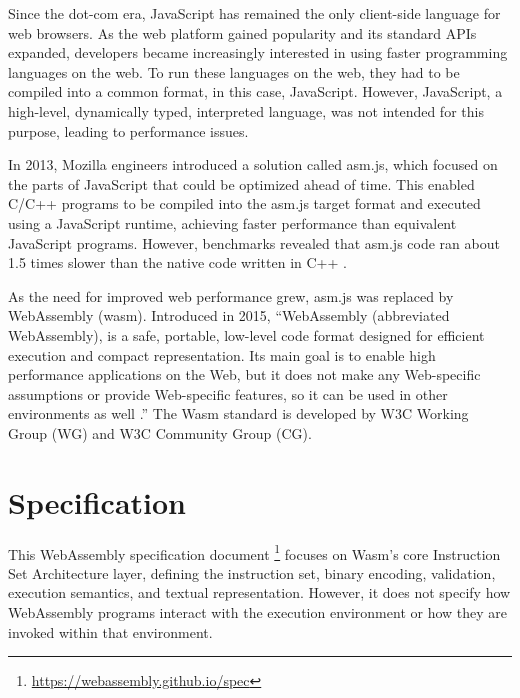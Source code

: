 Since the dot-com era, JavaScript has remained the only client-side language for web browsers. As the web platform gained popularity and its standard APIs expanded, developers became increasingly interested in using faster programming languages on the web. To run these languages on the web, they had to be compiled into a common format, in this case, JavaScript. However, JavaScript, a high-level, dynamically typed, interpreted language, was not intended for this purpose, leading to performance issues.

In 2013, Mozilla engineers introduced a solution called asm.js, which focused on the parts of JavaScript that could be optimized ahead of time. This enabled C/C++ programs to be compiled into the asm.js target format and executed using a JavaScript runtime, achieving faster performance than equivalent JavaScript programs. However, benchmarks revealed that asm.js code ran about 1.5 times slower than the native code written in C++ \cite{zakai_2013_gap}.

As the need for improved web performance grew, asm.js was replaced by WebAssembly (wasm).
Introduced in 2015, “WebAssembly (abbreviated \Gls{WebAssembly}), is a safe, portable, low-level code format designed for efficient execution and compact representation. Its main goal is to enable high performance applications on the Web, but it does not make any Web-specific assumptions or provide Web-specific features, so it can be used in other environments as well \cite[p.~1]{webassemblycommunitygroup_2023_webassembly}.”
The Wasm standard is developed by W3C Working Group (WG) and W3C Community Group (CG). 



\section{Specification}
\label{sec:specification}
This WebAssembly specification document \footnote{\url{https://webassembly.github.io/spec}} focuses on Wasm's core Instruction Set Architecture layer, defining the instruction set, binary encoding, validation, execution semantics, and textual representation. However, it does not specify how WebAssembly programs interact with the execution environment or how they are invoked within that environment.

